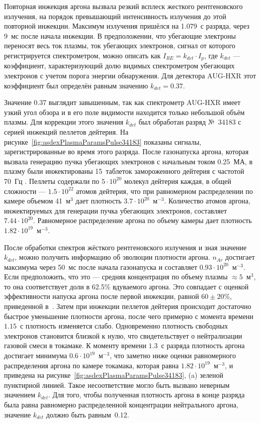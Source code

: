 Повторная инжекция аргона вызвала резкий всплеск жесткого рентгеновского излучения, на порядок превышающий интенсивность излучения до этой повторной инжекции. Максимум излучения пришёлся на 1.079~с разряда, через 9~мс после начала инжекции. В предположении, что убегающие электроны переносят весь ток плазмы, ток убегающих электронов, сигнал от которого регистрируется спектрометром, можно описать как $I_{RE} = k_{det} \cdot I_p$, где $k_{det}$ --- коэффициент, характеризующий долю видимых спектрометром убегающих электронов с учетом порога энергии обнаружения. Для детектора AUG-HXR этот коэффициент был определён равным значению $k_{det} = 0.37$.

Значение 0.37 выглядит завышенным, так как спектрометр AUG-HXR имеет узкий угол обзора и в его поле видимости находится только небольшой объём плазмы. Для коррекции этого значения $k_{det}$ был обработан разряд №~34183 с серией инжекций пеллетов дейтерия. На рисунке~\ref{fig:asdexPlasmaParamsPulse34183} показаны сигналы, зарегистрированные во время этого разряда. После газонапуска аргона, которая вызвала генерацию пучка убегающих электронов с начальным током 0.25~МА, в плазму были инжектированы 15~таблеток замороженного дейтерия с частотой 70~Гц \cite{Pautasso2020}. Пеллеты содержали по $5 \cdot 10^{20}$ молекул дейтерия каждая, в общей сложности --- $1.5 \cdot 10^{22}$ атомов дейтерия, что при равномерном распределении по камере объемом 41~м${}^3$ дает плотность $3.7 \cdot 10^{20}$~м${}^{-3}$. Количество атомов аргона, инжектируемых для генерации пучка убегающих электронов, составляет $7.44 \cdot 10^{20}$. Равномерное распределение аргона по объему камеры дает плотность $1.82 \cdot 10^{19}$~м${}^{-3}$.~\cite{Shevelev2021} 

После обработки спектров жёсткого рентгеновского излучения и зная значение $k_{det}$, можно получить информацию об эволюции плотности аргона. $n_{Ar}$ достигает максимума через 50~мс после начала газонапуска и составляет $0.93 \cdot 10^{20}$~м${}^{-3}$. Если предположить, что это --- средняя концентрация по объему плазмы $\approx 5$~м${}^3$, то она соответствует доли в 62.5\% вдуваемого аргона. Это совпадает с оценкой эффективности напуска аргона после первой инжекции, равной $60 \pm 20$\%, приведенной в~\cite{Pautasso2020}. Затем при инжекции пеллетов дейтерия происходит достаточно быстрое уменьшение плотности аргона, после чего примерно с момента времени $1.15$~с плотность изменяется слабо. Одновременно плотность свободных электронов становится близкой к нулю, что свидетельствует о нейтрализации газовой смеси в токамаке. К моменту времени $1.3$~с разряда плотность аргона достигает минимума $0.6 \cdot 10^{19}$~м${}^{-3}$, что заметно ниже оценки равномерного распределения аргона по камере токамака, которая равна $1.82 \cdot 10^{19}$~м${}^{-3}$, и приведена на рисунке~\ref{fig:asdexPlasmaParamsPulse34183}, (a) зеленой пунктирной линией. Такое несоответствие могло быть вызвано неверным значением $k_{det}$. Для того, чтобы полученная плотность аргона в конце разряда была равна равномерно распределенной концентрации нейтрального аргона, значение $k_{det}$ должно быть равным~0.12.~\cite{Shevelev2021}

